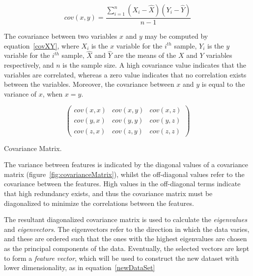 \begin{equation}\label{covXY}
	cov(x, y) = \frac{\sum^{n}_{i=1}(X_i - \hat{X})(Y_i - \hat{Y})}{n-1}
	\end{equation}

The covariance between two variables $x$ and $y$ may be computed by equation~\ref{covXY}, where $X_{i}$ is the $x$ variable for the $i^{th}$ sample, $Y_{i}$ is the $y$ variable for the $i^{th}$ sample, $\hat{X}$ and $\hat{Y}$ are the means of the $X$ and $Y$ variables respectively, and $n$ is the sample size. A high covariance value indicates that the variables are correlated, whereas a zero value indicates that no correlation exists between the variables. Moreover, the covariance between $x$ and $y$ is equal to the variance of $x$, when $x = y$. 

\begin{marginfigure}
	\begin{equation*}
        \begin{pmatrix} cov(x, x) & cov(x, y) & cov(x, z) \\ cov(y, x) & cov(y, y) & cov(y, z) \\ cov(z, x) & cov(z, y) & cov(z, z)
        \end{pmatrix}
\end{equation*}
\caption{Covariance Matrix.}
\label{fig:covarianceMatrix}
\end{marginfigure}

The variance between features is indicated by the diagonal values of a covariance matrix (figure~\ref{fig:covarianceMatrix}), whilst the off-diagonal values refer to the covariance between the features. High values in the off-diagonal terms indicate that high redundancy exists, and thus the covariance matrix must be diagonalized to minimize the correlations between the features. 

The resultant diagonalized covariance matrix is used to calculate the \textit{eigenvalues} and \textit{eigenvectors}. The eigenvectors refer to the direction in which the data varies, and these are ordered such that the ones with the highest eigenvalues are chosen as the principal components of the data. Eventually, the selected vectors are kept to form a \textit{feature vector}, which will be used to construct the new dataset with lower dimensionality, as in equation~\ref{newDataSet} 


